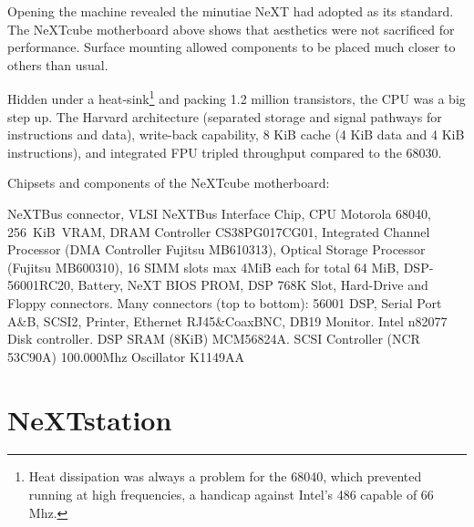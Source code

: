 \par
Opening the machine revealed the minutiae NeXT had adopted as its standard. The NeXTcube motherboard above shows that aesthetics were not sacrificed for performance. Surface mounting allowed components to be placed much closer to others than usual.\\
\par
Hidden under a heat-sink\footnote{Heat dissipation was always a problem for the 68040, which prevented running at high frequencies, a handicap against Intel's 486 capable of 66 Mhz.} and packing 1.2 million transistors, the CPU was a big step up. The Harvard architecture (separated storage and signal pathways for instructions and data), write-back capability, 8 KiB cache (4 KiB data and 4 KiB instructions), and integrated FPU tripled throughput compared to the 68030.





\vspace{50 mm}
\par
Chipsets and components of the NeXTcube motherboard:\\
\par 
{} NeXTBus connector,
 VLSI NeXTBus Interface Chip,
 CPU Motorola 68040,
 256~KiB~VRAM,
 DRAM Controller CS38PG017CG01,
 Integrated Channel Processor (DMA Controller Fujitsu MB610313),
 Optical Storage Processor (Fujitsu MB600310),
 16 SIMM slots max 4MiB each for total 64 MiB,
 DSP-56001RC20,
 Battery,
 NeXT BIOS PROM,
 DSP 768K Slot,
 Hard-Drive and Floppy connectors.
 Many connectors (top to bottom): 56001 DSP, Serial Port A\&B, SCSI2, Printer, Ethernet RJ45\&CoaxBNC, DB19 Monitor. 
 Intel n82077 Disk controller.
 DSP SRAM (8KiB) MCM56824A.
 SCSI Controller (NCR 53C90A)
 100.000Mhz Oscillator K1149AA






\section{NeXTstation}

